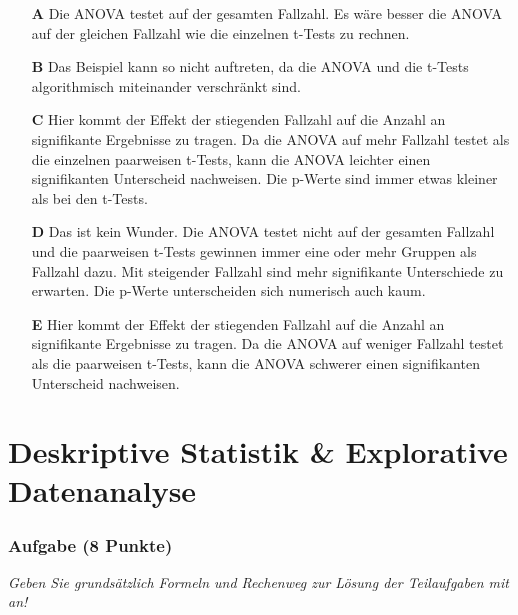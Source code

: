 \documentclass[a4paper, 9pt]{scrartcl}\usepackage[]{graphicx}\usepackage[]{xcolor}
\begin{document}
\begin{enumerate}
\item [\textbf{A} \msquare] Die ANOVA testet auf der gesamten Fallzahl. Es wäre besser die ANOVA auf der gleichen Fallzahl wie die einzelnen t-Tests zu rechnen.
\item [\textbf{B} \msquare] Das Beispiel kann so nicht auftreten, da die ANOVA und die t-Tests algorithmisch miteinander verschränkt sind.
\item [\textbf{C} \msquare] Hier kommt der Effekt der stiegenden Fallzahl auf die Anzahl an signifikante Ergebnisse zu tragen. Da die ANOVA auf mehr Fallzahl testet als die einzelnen paarweisen t-Tests, kann die ANOVA leichter einen signifikanten Unterscheid nachweisen. Die p-Werte sind immer etwas kleiner als bei den t-Tests.
\item [\textbf{D} \msquare] Das ist kein Wunder. Die ANOVA testet nicht auf der gesamten Fallzahl und die paarweisen t-Tests gewinnen immer eine oder mehr Gruppen als Fallzahl dazu. Mit steigender Fallzahl sind mehr signifikante Unterschiede zu erwarten. Die p-Werte unterscheiden sich numerisch auch kaum.
\item [\textbf{E} \msquare] Hier kommt der Effekt der stiegenden Fallzahl auf die Anzahl an signifikante Ergebnisse zu tragen. Da die ANOVA auf weniger Fallzahl testet als die paarweisen t-Tests, kann die ANOVA schwerer einen signifikanten Unterscheid nachweisen.
\end{enumerate}
    
\clearpage
\part{Deskriptive Statistik \& Explorative Datenanalyse}

\section{Aufgabe \hfill (8 Punkte)}

\textit{Geben Sie grundsätzlich Formeln und Rechenweg zur Lösung der Teilaufgaben mit an!} \\[1Ex]
 
\end{document}
